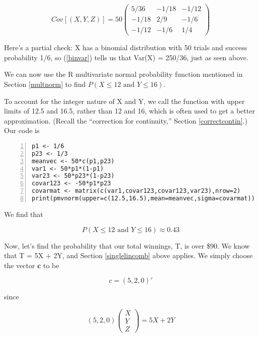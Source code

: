 \begin{equation}
Cov[(X,Y,Z)] =  
50
\begin{pmatrix}
5/36 & -1/18 & -1/12 \\
-1/18 & 2/9 & -1/6 \\
-1/12 & -1/6 & 1/4 
\end{pmatrix}
\end{equation}

Here's a partial check:  X has a binomial distribution with 50 trials
and success probability 1/6, so (\ref{binvar}) tells us that Var(X) =
250/36, just as seen above.

We can now use the R multivariate normal probability function mentioned
in Section \ref{multnorm} to find $P(X \leq 12 \textrm{ and } Y \leq
16)$.

To account for the integer nature of X and Y, we call the function with
upper limits of 12.5 and 16.5, rather than 12 and 16, which is often
used to get a better approximation.  (Recall the ``correction for
continuity,'' Section \ref{correctcontin}.) Our code is

\begin{Verbatim}[fontsize=\relsize{-2},numbers=left]
p1 <- 1/6
p23 <- 1/3
meanvec <- 50*c(p1,p23)
var1 <- 50*p1*(1-p1)
var23 <- 50*p23*(1-p23)
covar123 <- -50*p1*p23
covarmat <- matrix(c(var1,covar123,covar123,var23),nrow=2)
print(pmvnorm(upper=c(12.5,16.5),mean=meanvec,sigma=covarmat))
\end{Verbatim}

We find that 

\begin{equation}
P(X \leq 12 \textrm{ and } Y \leq 16) \approx 0.43
\end{equation}

Now, let's find the probability that our total winnings, T, is over
\$90.  We know that T = 5X + 2Y, and Section \ref{singlelincomb} above
applies.  We simply choose the vector {\bf c} to be

\begin{equation}
c = (5,2,0)'
\end{equation}

since

\begin{equation}
(5,2,0) 
\left (
\begin{array}{c}
X \\
Y \\
Z 
\end{array}
\right )
=  5X + 2Y
\end{equation}


